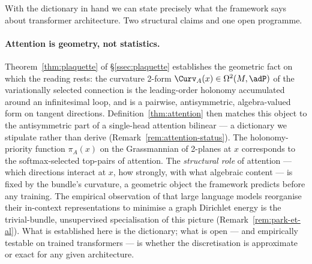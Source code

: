 With the dictionary in hand we can state precisely what the
framework says about transformer architecture. Two structural
claims and one open programme.

\paragraph{Attention is geometry, not statistics.}
Theorem~\ref{thm:plaquette} of \S\ref{ssec:plaquette} establishes
the geometric fact on which the reading rests: the curvature 2-form
$\Curv_A(x)\in\Omega^2(M,\adP)$ of the variationally selected
connection is the leading-order holonomy accumulated around an
infinitesimal loop, and is a pairwise, antisymmetric, algebra-valued
form on tangent directions. Definition~\ref{thm:attention} then
matches this object to the antisymmetric part of a single-head
attention bilinear --- a dictionary we stipulate rather than derive
(Remark~\ref{rem:attention-status}). The holonomy-priority function
$\pi_A(x)$ on the
Grassmannian of 2-planes at $x$ corresponds to the softmax-selected
top-pairs of attention. The \emph{structural role} of attention ---
which directions interact at $x$, how strongly, with what
algebraic content --- is fixed by the bundle's curvature, a
geometric object the framework predicts before any training. The
empirical observation of \cite{ParkEtAl2024} that large language
models reorganise their in-context representations to minimise a
graph Dirichlet energy is the trivial-bundle, unsupervised
specialisation of this picture (Remark~\ref{rem:park-et-al}).
What is established here is the dictionary; what is open --- and
empirically testable on trained transformers --- is whether the
discretisation is approximate or exact for any given
architecture.

